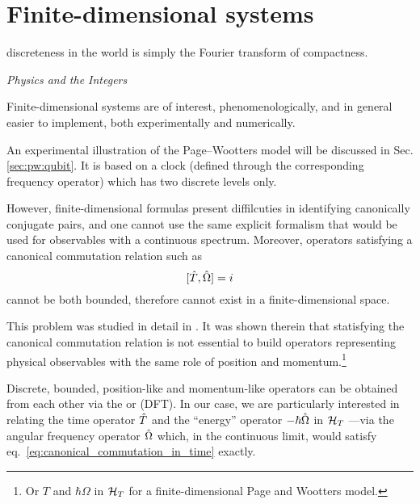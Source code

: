 \section{Finite-dimensional systems}\label{sec:finite-quantum}\label{sec:pw:theory_last}
\epigraph{\textelp{} discreteness in the world is simply the Fourier transform of compactness.}{%
  \emph{Physics and the Integers} \parencite{Tong_Integers}%
}

\noindent
Finite-dimensional systems are of interest, phenomenologically,
and in general easier to implement,
both experimentally and numerically.

An experimental illustration of the Page--Wootters model will be discussed in Sec. \ref{sec:pw:qubit}.
It is based on a clock
(defined through the corresponding frequency operator)
which has two discrete levels only.

However,
finite-dimensional formulas
present diffilcuties in identifying canonically conjugate
pairs, and one cannot use the same explicit formalism
that would be used for observables with a continuous spectrum.
Moreover, operators satisfying a canonical
commutation relation such as
\begin{equation}\label{eq:canonical_commutation_in_time}
  [\hat{T}, \hat{\Omega}] = i
\end{equation}
cannot be both bounded, therefore cannot exist in a finite-dimensional space.

This problem was studied in detail in
\cite{FiniteHilb}. It was shown therein
that statisfying the canonical commutation relation
is not essential to build operators representing physical observables
with the same role of position and momentum.\footnote{
  Or $T$ and $\hbar\Omega$
  in $\mathcal{H}_T$ for a finite-dimensional Page and Wootters model.
}

Discrete, bounded, position-like and momentum-like operators can be obtained from
each other via
the  or   (DFT).
In our case, we are particularly interested in relating the
time operator $\hat{T}$ and the ``energy'' operator $-\hbar\hat{\Omega}$
in $\mathcal{H}_T$ ---via the angular frequency operator $\hat{\Omega}$ which, in the continuous limit, would satisfy
eq.~\eqref{eq:canonical_commutation_in_time} exactly.


